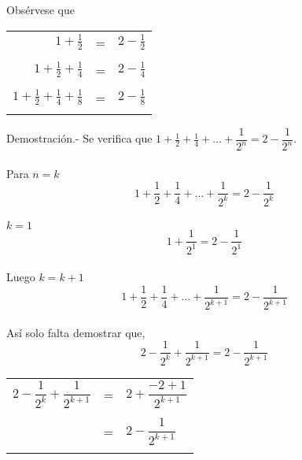 \begin{ej}
Obsérvese que 
\begin{center}
\begin{tabular}{r c l}
$1+\frac{1}{2}$&=&$2-\frac{1}{2}$\\\\
$1+\frac{1}{2}+\frac{1}{4}$&=&$2-\frac{1}{4}$\\\\
$1+\frac{1}{2}+\frac{1}{4}+\frac{1}{8}$&=&$2-\frac{1}{8}$\\\\
\end{tabular}
\end{center}
Demostración.- \; Se verifica que $1+\frac{1}{2}+\frac{1}{4}+...+\dfrac{1}{2^n}=2-\dfrac{1}{2^n}$.\\\\
Para $n=k$ $$1+\frac{1}{2}+\frac{1}{4}+...+\dfrac{1}{2^k}=2-\dfrac{1}{2^k}$$\\
$k=1$ $$1+\dfrac{1}{2^1}=2-\dfrac{1}{2^1}$$\\
Luego $k=k+1$ $$1+\frac{1}{2}+\frac{1}{4}+...+\dfrac{1}{2^{k+1}}=2-\dfrac{1}{2^{k+1}}$$\\
Así solo falta demostrar que, $$2-\dfrac{1}{2^k}+\dfrac{1}{2^{k+1}}=2-\dfrac{1}{2^{k+1}}$$
\begin{center}
\begin{tabular}{r c l}
$2-\dfrac{1}{2^k}+\dfrac{1}{2^{k+1}}$&=&$2+\dfrac{-2+1}{2^{k+1}}$\\\\
&=&$2-\dfrac{1}{2^{k+1}}$\\\\
\end{tabular}
\end{center}
\end{ej}

